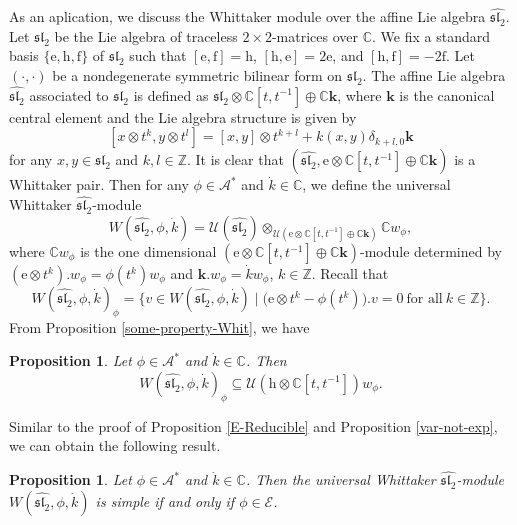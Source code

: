 \documentclass[12pt, a4paper]{amsart}
\newcommand{\C}{\mathbb{C}}
\newcommand{\Z}{\mathbb Z}
\newcommand{\rh}{\mathrm{h}}
\newcommand{\re}{\mathrm{e}}
\newcommand{\rf}{\mathrm{f}}
\newcommand{\U}{\mathcal{U}}
\theoremstyle{Theorem}
\theoremstyle{Theorem}
\newtheorem{proposition}[thm]{Proposition}
\numberwithin{equation}{section}
\begin{document}
As an aplication, we discuss the Whittaker module over the affine Lie algebra $\widehat{\mathfrak{sl}_{2}}$.
Let $\mathfrak{sl}_{2}$ be the Lie algebra of traceless $2\times2$-matrices over $\C$. We fix a standard basis
$\{\re,\rh,\rf\}$ of $\mathfrak{sl}_{2}$ such that $[\re,\rf]=\rh$, $[\rh,\re]=2\re$, and $[\rh,\rf]=-2\rf$.
Let $(\cdot,\cdot)$ be a nondegenerate symmetric bilinear form on $\mathfrak{sl}_{2}$.
The affine Lie algebra $\widehat{\mathfrak{sl}_{2}}$ associated to $\mathfrak{sl}_{2}$ is defined as
$\mathfrak{sl}_{2}\otimes\C[t,t^{-1}]\oplus\C\bm{k}$, where $\bm{k}$ is the canonical central element
and the Lie algebra structure is given by
\[[x\otimes t^{k},y\otimes t^{l}]=[x,y]\otimes t^{k+l}+k(x,y)\delta_{k+l,0}\bm{k}\]
for any $x,y\in\mathfrak{sl}_{2}$ and $k,l\in\Z$.
It is clear that $(\widehat{\mathfrak{sl}_{2}},\re\otimes\C[t,t^{-1}]\oplus\C\bm{k})$ is a Whittaker pair.
Then for any $\phi\in\mathcal{A}^*$ and $\dot{k}\in\C$,
we define the universal Whittaker $\widehat{\mathfrak{sl}_{2}}$-module
\[W(\widehat{\mathfrak{sl}_{2}},\phi,\dot{k})=\U(\widehat{\mathfrak{sl}_{2}})
\otimes_{\U(\re\otimes\C[t,t^{-1}]\oplus\C\bm{k})}\C w_{\phi},\]
where $\C w_{\phi}$ is the one dimensional $(\re\otimes\C[t,t^{-1}]\oplus\C\bm{k})$-module determined
by $(\re\otimes t^{k}).w_{\phi}=\phi(t^{k})w_{\phi}$ and $\bm{k}.w_{\phi}=\dot{k}w_{\phi}$, $k\in\Z$.
Recall that \[W(\widehat{\mathfrak{sl}_{2}},\phi,\dot{k})_{\phi}
=\{v\in W(\widehat{\mathfrak{sl}_{2}},\phi,\dot{k})\mid \big(\re\otimes t^{k}-\phi(t^{k})\big).v=0\ \text{for all}\ k\in\Z\}.\]
From Proposition \ref{some-property-Whit}, we have
\begin{proposition}
Let $\phi\in\mathcal{A}^*$ and $\dot{k}\in\C$. Then
\[W(\widehat{\mathfrak{sl}_{2}},\phi,\dot{k})_{\phi}\subseteq\U(\rh\otimes\C[t,t^{-1}])w_{\phi}.\]
\end{proposition}

Similar to the proof of Proposition \ref{E-Reducible} and Proposition \ref{var-not-exp},
we can obtain the following result.
\begin{proposition}\label{sl-2}
Let $\phi\in\mathcal{A}^*$ and $\dot{k}\in\C$. Then the universal Whittaker $\widehat{\mathfrak{sl}_{2}}$-module $W(\widehat{\mathfrak{sl}_{2}},\phi,\dot{k})$ is simple if and only if $\phi\in\mathcal{E}$.
\end{proposition}
\end{document}
